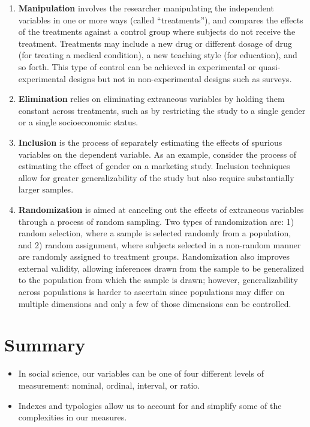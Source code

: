 \begin{enumerate}
	\item \textbf{Manipulation} involves the researcher manipulating the independent variables in one or more ways (called ``treatments''), and compares the effects of the treatments against a control group where subjects do not receive the treatment. Treatments may include a new drug or different dosage of drug (for treating a medical condition), a new teaching style (for education), and so forth. This type of control can be achieved in experimental or quasi-experimental designs but not in non-experimental designs such as surveys. 
	
	\item \textbf{Elimination} relies on eliminating extraneous variables by holding them constant across treatments, such as by restricting the study to a single gender or a single socioeconomic status. 
	
	\item \textbf{Inclusion} is the process of separately estimating the effects of spurious variables on the dependent variable. As an example, consider the process of estimating the effect of gender on a marketing study. Inclusion techniques allow for greater generalizability of the study but also require substantially larger samples. 
	
	\item \textbf{Randomization} is aimed at canceling out the effects of extraneous variables through a process of random sampling. Two types of randomization are: 1) random selection, where a sample is selected randomly from a population, and 2) random assignment, where subjects selected in a non-random manner are randomly assigned to treatment groups. Randomization also improves external validity, allowing inferences drawn from the sample to be generalized to the population from which the sample is drawn; however, generalizability across populations is harder to ascertain since populations may differ on multiple dimensions and only a few of those dimensions can be controlled.
	
\end{enumerate}

\section{Summary}\label{ch06:summary}

\begin{itemize}
	\setlength{\itemsep}{0pt}
	\setlength{\parskip}{0pt}
	\setlength{\parsep}{0pt}
	
	\item In social science, our variables can be one of four different levels of measurement: nominal, ordinal, interval, or ratio.
	\item Indexes and typologies allow us to account for and simplify some of the complexities in our measures.
	
\end{itemize}

